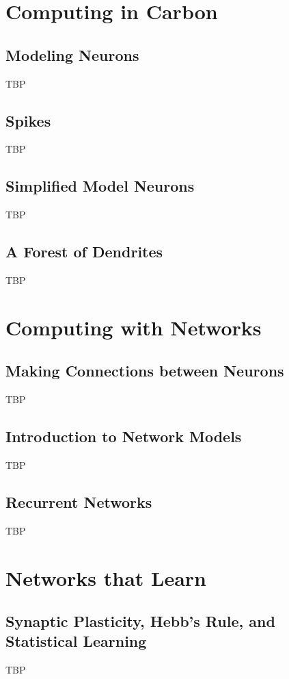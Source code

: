 \documentclass[]{article}
\begin{document}
\section{Computing in Carbon}\label{sec:week5}

\subsection{Modeling Neurons}
TBP

\subsection{Spikes}
TBP

\subsection{Simplified Model Neurons}
TBP

\subsection{A Forest of Dendrites}
TBP

\section{Computing with Networks}\label{sec:week6}

\subsection{Making Connections between Neurons}
TBP

\subsection{Introduction to Network Models}
TBP

\subsection{Recurrent Networks}
TBP

\section{Networks that Learn}\label{sec:week7}

\subsection{Synaptic Plasticity, Hebb's Rule, and Statistical Learning}
TBP
\end{document}

